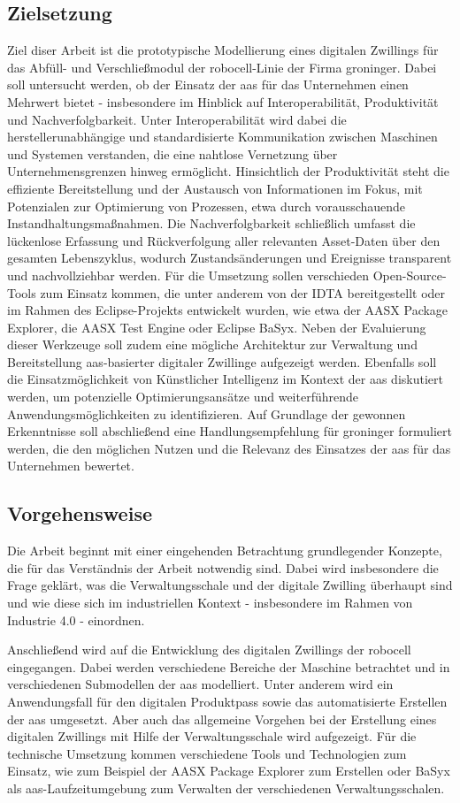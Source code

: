 \subsection{Zielsetzung}
Ziel diser Arbeit ist die prototypische Modellierung eines digitalen Zwillings für das Abfüll- und Verschließmodul der robocell-Linie der Firma groninger.
Dabei soll untersucht werden, ob der Einsatz der \acs{aas} für das Unternehmen einen Mehrwert bietet - insbesondere im Hinblick auf Interoperabilität, Produktivität und Nachverfolgbarkeit.
Unter Interoperabilität wird dabei die herstellerunabhängige und standardisierte Kommunikation zwischen Maschinen und Systemen verstanden, die eine nahtlose Vernetzung über Unternehmensgrenzen hinweg ermöglicht.
Hinsichtlich der Produktivität steht die effiziente Bereitstellung und der Austausch von Informationen im Fokus, mit Potenzialen zur Optimierung von Prozessen, etwa durch vorausschauende Instandhaltungsmaßnahmen. 
Die Nachverfolgbarkeit schließlich umfasst die lückenlose Erfassung und Rückverfolgung aller relevanten Asset-Daten über den gesamten Lebenszyklus, wodurch Zustandsänderungen und Ereignisse transparent und nachvollziehbar werden.
Für die Umsetzung sollen verschieden Open-Source-Tools zum Einsatz kommen, die unter anderem von der IDTA bereitgestellt oder im Rahmen des Eclipse-Projekts entwickelt wurden, wie etwa der AASX Package Explorer, die AASX Test Engine oder Eclipse BaSyx.
Neben der Evaluierung dieser Werkzeuge soll zudem eine mögliche Architektur zur Verwaltung und Bereitstellung \acs{aas}-basierter digitaler Zwillinge aufgezeigt werden.
Ebenfalls soll die Einsatzmöglichkeit von Künstlicher Intelligenz im Kontext der \acs{aas} diskutiert werden, um potenzielle Optimierungsansätze und weiterführende Anwendungsmöglichkeiten zu identifizieren.
Auf Grundlage der gewonnen Erkenntnisse soll abschließend eine Handlungsempfehlung für groninger formuliert werden, die den möglichen Nutzen und die Relevanz des Einsatzes der \acs{aas} für das Unternehmen bewertet.
\subsection{Vorgehensweise}
Die Arbeit beginnt mit einer eingehenden Betrachtung grundlegender Konzepte, die für das Verständnis der Arbeit notwendig sind. 
Dabei wird insbesondere die Frage geklärt, was die Verwaltungsschale und der digitale Zwilling überhaupt sind und wie diese sich im industriellen Kontext - insbesondere im Rahmen von Industrie 4.0 - einordnen.

Anschließend wird auf die Entwicklung des digitalen Zwillings der robocell eingegangen. 
Dabei werden verschiedene Bereiche der Maschine betrachtet und in verschiedenen Submodellen der \acs{aas} modelliert.
Unter anderem wird ein Anwendungsfall für den digitalen Produktpass sowie das automatisierte Erstellen der \acs{aas} umgesetzt.
Aber auch das allgemeine Vorgehen bei der Erstellung eines digitalen Zwillings mit Hilfe der Verwaltungsschale wird aufgezeigt.
Für die technische Umsetzung kommen verschiedene Tools und Technologien zum Einsatz, wie zum Beispiel der AASX Package Explorer zum Erstellen oder BaSyx als \acs{aas}-Laufzeitumgebung zum Verwalten der verschiedenen Verwaltungsschalen.



